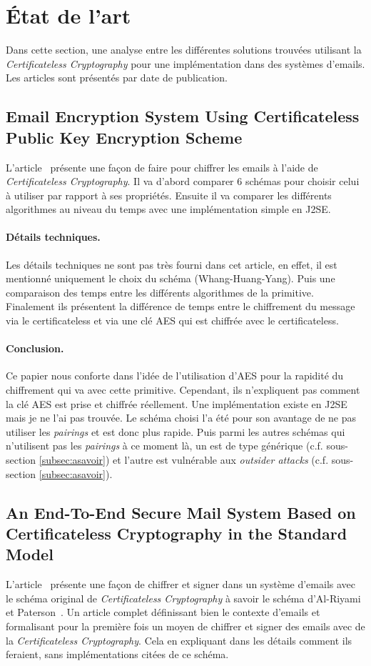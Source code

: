\section{État de l'art}
Dans cette section, une analyse entre les différentes solutions trouvées utilisant la \textit{Certificateless Cryptography} pour une implémentation dans des systèmes d'emails. Les articles sont présentés par date de publication. 

\subsection{Email Encryption System Using Certificateless Public Key Encryption Scheme}
L'article~\cite{conf/itcs2/ErYTG12} présente une façon de faire pour chiffrer les emails à l'aide de \textit{Certificateless Cryptography}. Il va d'abord comparer 6 schémas pour choisir celui à utiliser par rapport à ses propriétés. Ensuite il va comparer les différents algorithmes au niveau du temps avec une implémentation simple en J2SE. 
\paragraph*{Détails techniques.} Les détails techniques ne sont pas très fourni dans cet article, en effet, il est mentionné uniquement le choix du schéma (Whang-Huang-Yang). Puis une comparaison des temps entre les différents algorithmes de la primitive. Finalement ils présentent la différence de temps entre le chiffrement du message via le certificateless et via une clé AES qui est chiffrée avec le certificateless.
\paragraph*{Conclusion.} Ce papier nous conforte dans l'idée de l'utilisation d'AES pour la rapidité du chiffrement qui va avec cette primitive. Cependant, ils n'expliquent pas comment la clé AES est prise et chiffrée réellement. Une implémentation existe en J2SE mais je ne l'ai pas trouvée. Le schéma choisi l'a été pour son avantage de ne pas utiliser les \textit{pairings} et est donc plus rapide. Puis parmi les autres schémas qui n'utilisent pas les \textit{pairings} à ce moment là, un est de type générique (c.f. sous-section \ref{subsec:asavoir}) et l'autre est vulnérable aux \textit{outsider attacks} (c.f. sous-section \ref{subsec:asavoir}).

\subsection{An End-To-End Secure Mail System Based on Certificateless Cryptography in the Standard Model}
L'article~\cite{endToEndSecureEmailArticle} présente une façon de chiffrer et signer dans un système d'emails avec le schéma original de \textit{Certificateless Cryptography} à savoir le schéma d'Al-Riyami et Paterson~\cite{conf/asiacrypt/Al-RiyamiP03}. Un article complet définissant bien le contexte d'emails et formalisant pour la première fois un moyen de chiffrer et signer des emails avec de la \textit{Certificateless Cryptography}. Cela en expliquant dans les détails comment ils feraient, sans implémentations citées de ce schéma.
